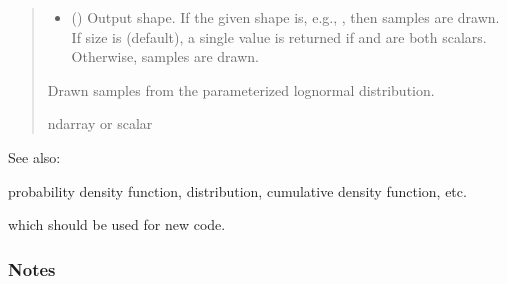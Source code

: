\documentclass[letterpaper,10pt,english]{sphinxmanual}
\begin{document}
\begin{fulllineitems}
\begin{quote}
\begin{description}
\begin{itemize}
\item {} 
\sphinxAtStartPar
{} (\sphinxstyleliteralemphasis{\sphinxupquote{, }}) \textendash{} Output shape.  If the given shape is, e.g., , then
 samples are drawn.  If size is  (default),
a single value is returned if  and  are both scalars.
Otherwise,  samples are drawn.

\end{itemize}

\sphinxAtStartPar
{} \textendash{} Drawn samples from the parameterized log\sphinxhyphen{}normal distribution.

\sphinxAtStartPar
ndarray or scalar

\end{description}\end{quote}


\begin{sphinxseealso}{See also:}
\begin{description}
\sphinxAtStartPar
probability density function, distribution, cumulative density function, etc.

\sphinxAtStartPar
which should be used for new code.

\end{description}


\end{sphinxseealso}

\subsubsection*{Notes}


\end{fulllineitems}
\end{document}
